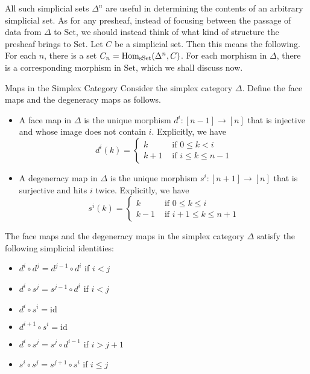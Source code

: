 \documentclass[a4paper]{article}
\begin{document}
All such simplicial sets $\Delta^n$ are useful in determining the contents of an arbitrary simplicial set. As for any presheaf, instead of focusing between the passage of data from $\Delta$ to $\text{Set}$, we should instead think of what kind of structure the presheaf brings to $\text{Set}$. Let $C$ be a simplicial set. Then this means the following. For each $n$, there is a set $C_n=\operatorname{Hom}_\text{sSet}(\Delta^n,C)$. For each morphism in $\Delta$, there is a corresponding morphism in $\text{Set}$, which we shall discuss now. 

\begin{defn}{Maps in the Simplex Category}{} Consider the simplex category $\Delta$. Define the face maps and the degeneracy maps as follows. 
\begin{itemize}
\item A face map in $\Delta$ is the unique morphism $d^i:[n-1]\to[n]$ that is injective and whose image does not contain $i$. Explicitly, we have $$d^i(k)=\begin{cases}
k & \text{ if } 0\leq k <i\\
k+1 & \text{ if } i\leq k\leq n-1
\end{cases}$$
\item A degeneracy map in $\Delta$ is the unique morphism $s^i:[n+1]\to[n]$ that is surjective and hits $i$ twice. Explicitly, we have $$s^i(k)=\begin{cases}
k & \text{ if } 0\leq k\leq i\\
k-1 & \text{ if } i+1\leq k\leq n+1
\end{cases}$$
\end{itemize}
\end{defn}

\begin{prp}{}{} The face maps and the degeneracy maps in the simplex category $\Delta$ satisfy the following simplicial identities: 
\begin{itemize}
\item $d^i\circ d^j=d^{j-1}\circ d^i$ if $i<j$
\item $d^i\circ s^j=s^{j-1}\circ d^i$ if $i<j$
\item $d^i\circ s^i=\text{id}$
\item $d^{i+1}\circ s^i=\text{id}$
\item $d^i\circ s^j=s^j\circ d^{i-1}$ if $i>j+1$
\item $s^i\circ s^j=s^{j+1}\circ s^i$ if $i\leq j$
\end{itemize}
\end{prp}
\end{document}

